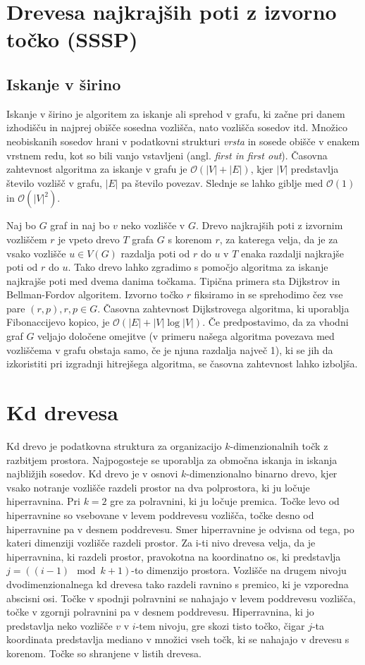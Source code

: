 \documentclass[a4paper, 12pt]{book}
\newcommand{\OO}{\ensuremath{\mathcal{O}}} %
\begin{document}
\section{Drevesa najkrajših poti z izvorno točko (SSSP)}
\subsection*{Iskanje  v širino}
Iskanje v širino je algoritem za iskanje ali sprehod v grafu, ki začne pri danem izhodišču in najprej obišče sosedna vozlišča, nato vozlišča sosedov itd. Množico neobiskanih sosedov hrani v podatkovni strukturi \textit{vrsta} in sosede obišče v enakem vrstnem redu, kot so bili vanjo vstavljeni (angl. \textit{first in first out}). Časovna zahtevnost algoritma za iskanje v grafu je $\OO(|V| + |E|)$, kjer $|V|$ predstavlja število vozlišč v grafu, $|E|$ pa število povezav. Slednje se lahko giblje med $\OO(1)$ in $\OO(|V|^2)$.

\bigbreak
Naj bo $G$ graf in naj bo $v$ neko vozlišče v $G$.
Drevo najkrajših poti z izvornim vozliščem $r$ je vpeto drevo $T$ grafa $G$ s korenom $r$, za katerega velja, da je za vsako vozlišče $u\in V(G)$ razdalja poti od $r$ do $u$ v $T$ enaka razdalji najkrajše poti od $r$ do $u$. Tako drevo lahko zgradimo s pomočjo algoritma za iskanje najkrajše poti med dvema danima točkama. Tipična primera sta Dijkstrov in Bellman-Fordov algoritem. Izvorno točko $r$ fiksiramo in se sprehodimo čez vse pare $(r, p), r,p \in G.$ Časovna zahtevnost Dijkstrovega algoritma, ki uporablja Fibonaccijevo kopico, je $\OO(|E|+|V|\log |V|)$. Če predpostavimo, da za vhodni graf $G$ veljajo določene omejitve (v primeru našega algoritma povezava med vozliščema v grafu obstaja samo, če je njuna razdalja največ 1), ki se jih da izkoristiti pri izgradnji hitrejšega algoritma, se časovna zahtevnost lahko izboljša.

\section{Kd drevesa}

Kd drevo je podatkovna struktura za organizacijo $k$-dimenzionalnih točk z razbitjem prostora. Najpogosteje se uporablja za območna iskanja in iskanja najbližjih sosedov.
Kd drevo je v osnovi $k$-dimenzionalno binarno drevo, kjer vsako notranje vozlišče razdeli prostor na dva polprostora, ki ju ločuje hiperravnina. Pri $k=2$ gre za polravnini, ki ju ločuje premica. Točke levo od hiperravnine so vsebovane v levem poddrevesu vozlišča, točke desno od hiperravnine pa v desnem poddrevesu. Smer hiperravnine je odvisna od tega, po kateri dimenziji vozlišče razdeli prostor.
Za i-ti nivo drevesa velja, da je hiperravnina, ki razdeli prostor, pravokotna na koordinatno os, ki predstavlja $j = ((i-1)\mod k + 1)$-to dimenzijo prostora. Vozlišče na drugem nivoju dvodimenzionalnega kd drevesa tako razdeli
ravnino s premico, ki je vzporedna abscisni osi. Točke v spodnji polravnini se nahajajo v levem poddrevesu vozlišča, točke v zgornji polravnini pa v desnem poddrevesu. Hiperravnina, ki jo predstavlja neko vozlišče $v$ v $i$-tem nivoju,
gre skozi tisto točko, čigar $j$-ta koordinata predstavlja mediano v množici vseh točk, ki se nahajajo v drevesu s korenom. Točke so shranjene v listih drevesa.
\end{document}
